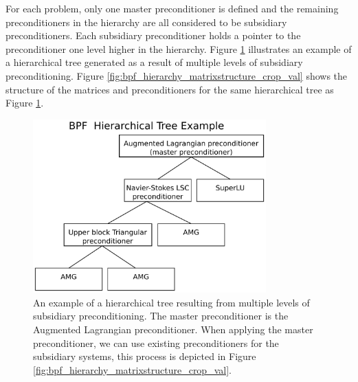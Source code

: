 For each problem, only one master preconditioner is defined and the remaining
preconditioners in the hierarchy are all considered to be subsidiary
preconditioners. Each subsidiary preconditioner holds a pointer to the
preconditioner one level higher in the hierarchy. Figure
\ref{fig:bpf_hierarchy_tree_crop_val} illustrates an example of a hierarchical tree
generated as a result of multiple levels of subsidiary preconditioning. Figure
\ref{fig:bpf_hierarchy_matrixstructure_crop_val} shows the structure of the
matrices and preconditioners for the same hierarchical tree as Figure
\ref{fig:bpf_hierarchy_tree_crop_val}.

\begin{figure}[H]
\centering
\includegraphics[width=0.8\textwidth]{./pic/bpf_hierarchy_tree_crop.pdf}
\caption{An example of a hierarchical tree resulting from multiple levels of
  subsidiary preconditioning. The master preconditioner is the Augmented
  Lagrangian preconditioner. When applying the master preconditioner, we can
  use existing preconditioners for the subsidiary systems, this process is
  depicted in Figure \ref{fig:bpf_hierarchy_matrixstructure_crop_val}.}
\label{fig:bpf_hierarchy_tree_crop_val}
\end{figure}

